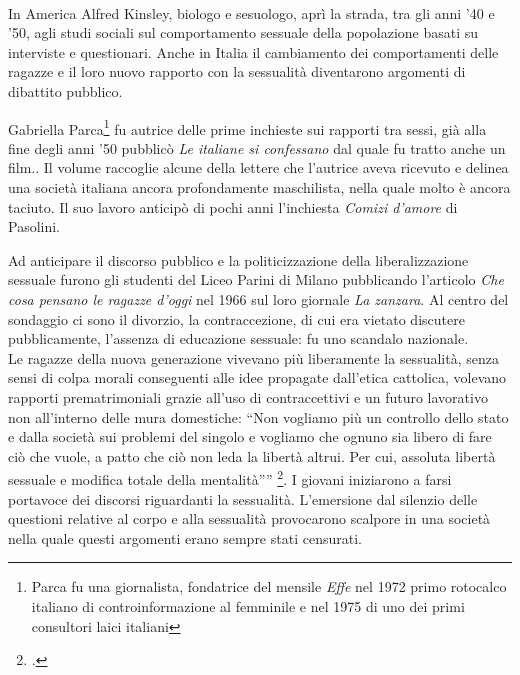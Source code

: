 \paragraph{}In America Alfred Kinsley, biologo e sesuologo, aprì la strada, tra gli anni '40 e '50, agli studi sociali sul comportamento sessuale della popolazione basati su interviste e questionari.
Anche in Italia il cambiamento dei comportamenti delle ragazze e il loro nuovo rapporto con la sessualità diventarono argomenti di dibattito pubblico.

Gabriella Parca\footnote{Parca fu una giornalista, fondatrice del mensile \textit{Effe} nel 1972 primo rotocalco italiano di controinformazione al femminile e nel 1975 di uno dei primi consultori laici italiani} fu autrice delle prime inchieste sui rapporti tra sessi, già alla fine degli anni '50 pubblicò \textit{Le italiane si confessano} dal quale fu tratto anche un film..
Il volume raccoglie alcune della lettere che l'autrice aveva ricevuto e delinea una società italiana ancora profondamente maschilista, nella quale molto è ancora taciuto.
Il suo lavoro anticipò di pochi anni l'inchiesta \textit{Comizi d'amore} di Pasolini.

Ad anticipare il discorso pubblico e la politicizzazione della liberalizzazione sessuale furono gli studenti del Liceo Parini di Milano pubblicando l'articolo \textit{Che cosa pensano le ragazze d’oggi} nel 1966 sul loro giornale \textit{La zanzara}.
Al centro del sondaggio ci sono il divorzio, la contraccezione, di cui era vietato discutere pubblicamente, l'assenza di educazione sessuale: fu uno scandalo nazionale.
\\Le ragazze della nuova generazione vivevano più liberamente la sessualità, senza sensi di colpa morali conseguenti alle idee propagate dall'etica cattolica, volevano rapporti prematrimoniali grazie all'uso di contraccettivi e un futuro lavorativo non all'interno delle mura domestiche: \enquote{Non vogliamo più un controllo dello stato e dalla società sui problemi del singolo e vogliamo che ognuno sia libero di fare ciò che vuole, a patto che ciò non leda la libertà altrui. Per cui, assoluta libertà sessuale e modifica totale della mentalità”} \footcite{Zanzara}.
I giovani iniziarono a farsi portavoce dei discorsi riguardanti la sessualità.
L'emersione dal silenzio delle questioni relative al corpo e alla sessualità provocarono scalpore in una società nella quale questi argomenti erano sempre stati censurati.

